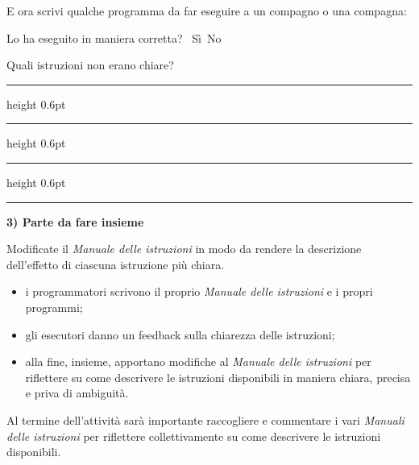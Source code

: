 \begin{scheda}[A2][3]
\label{scheda-inventare-2}
E ora scrivi qualche programma da far eseguire a un compagno o una compagna:\par
\vspace{7mm}
\begingroup
\setlength{\fboxsep}{0pt}
\setlength{\fboxrule}{0.6pt}
\noindent{}\par
\endgroup
\vspace{7mm}
Lo ha eseguito in maniera corretta? \schedacasella\ Sì\quad\schedacasella\ No\par
\vspace{6mm}
\hspace*{12mm}\begin{minipage}{\dimexpr\linewidth-12mm\relax}
Quali istruzioni non erano chiare?\par
\vspace{5mm}
{\color{black!55}%
\hrule height 0.6pt\vspace{8mm}
\hrule height 0.6pt\vspace{8mm}
\hrule height 0.6pt\vspace{8mm}
\noindent\rule{.31\linewidth}{0.6pt}\par}
\vspace{4mm}
\textbf{3) Parte da fare insieme}\par
Modificate il \emph{Manuale delle istruzioni} in modo da rendere la descrizione dell'effetto di ciascuna istruzione più chiara.
\end{minipage}\par
\end{scheda}

\begin{itemize}
\item
  i programmatori scrivono il proprio \emph{Manuale delle istruzioni} e i propri programmi;
\item
  gli esecutori danno un feedback sulla chiarezza delle istruzioni;
\item
  alla fine, insieme, apportano modifiche al \emph{Manuale delle istruzioni} per riflettere su come descrivere le istruzioni disponibili in maniera chiara, precisa e priva di ambiguità.
\end{itemize}

Al termine dell'attività sarà importante raccogliere e commentare i vari \emph{Manuali delle istruzioni} per riflettere collettivamente su come descrivere le istruzioni disponibili.

